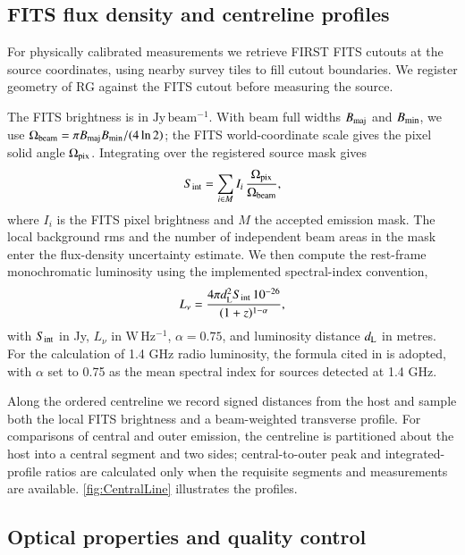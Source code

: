 \documentclass{aa}
\begin{document}
\subsection{FITS flux density and centreline profiles}

For physically calibrated measurements we retrieve FIRST FITS cutouts at the source coordinates, using nearby survey tiles to fill cutout boundaries. We register geometry of RG against the FITS cutout before measuring the source. 

The FITS brightness is in \(\mathrm{Jy\,beam^{-1}}\). With beam full widths \(B_{\rm maj}\) and \(B_{\rm min}\), we use \(\Omega_{\rm beam}=\pi B_{\rm maj}B_{\rm min}/(4\ln2)\); the FITS world-coordinate scale gives the pixel solid angle \(\Omega_{\rm pix}\). Integrating over the registered source mask gives
\begin{equation}
S_{\rm int}=\sum_{i\in M} I_i\,\frac{\Omega_{\rm pix}}{\Omega_{\rm beam}},
\end{equation}
where \(I_i\) is the FITS pixel brightness and \(M\) the accepted emission mask. The local background rms and the number of independent beam areas in the mask enter the flux-density uncertainty estimate. We then compute the rest-frame monochromatic luminosity using the implemented spectral-index convention,
\begin{equation}
L_{\nu}=\frac{4\pi d_{\rm L}^{2}S_{\rm int}\,10^{-26}}{(1+z)^{1-\alpha}},
\end{equation}
with \(S_{\rm int}\) in Jy, \(L_{\nu}\) in \(\mathrm{W\,Hz^{-1}}\), \(\alpha=0.75\), and luminosity distance \(d_{\rm L}\) in metres. For the calculation of 1.4 GHz radio luminosity, the formula cited in \cite{koziel-wierzbowska_2021} is adopted, with $\alpha$ set to 0.75 as the mean spectral index for sources detected at 1.4 GHz.

Along the ordered centreline we record signed distances from the host and sample both the local FITS brightness and a beam-weighted transverse profile. For comparisons of central and outer emission, the centreline is partitioned about the host into a central segment and two sides; central-to-outer peak and integrated-profile ratios are calculated only when the requisite segments and measurements are available. \autoref{fig:CentralLine} illustrates the profiles.

\subsection{Optical properties and quality control}
\end{document}

